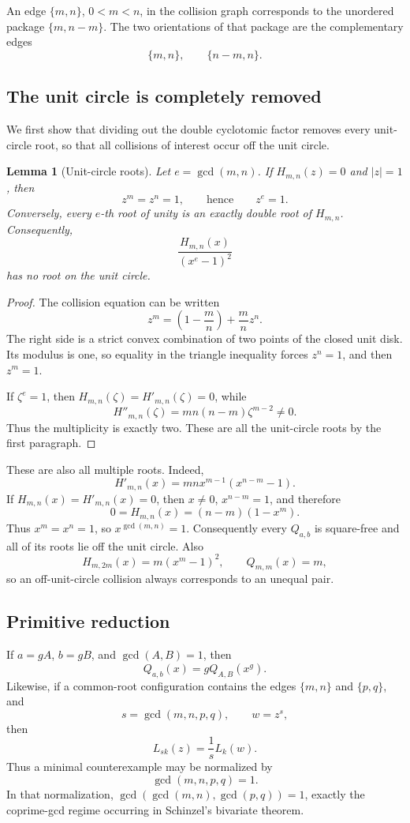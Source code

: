 \documentclass[11pt]{article}
\numberwithin{equation}{section}
\newtheorem{lemma}[theorem]{Lemma}
\theoremstyle{definition}
\begin{document}
An edge \(\{m,n\}\), \(0<m<n\), in the collision graph corresponds to the
unordered package \(\{m,n-m\}\).  The two orientations of that package are the
complementary edges
\[
 \{m,n\},\qquad \{n-m,n\}.
 \label{eq:2-4}
\]

\subsection{The unit circle is completely removed}

We first show that dividing out the double cyclotomic factor removes every
unit-circle root, so that all collisions of interest occur off the unit
circle.

\begin{lemma}[Unit-circle roots]\label{lem:unitcircle}
Let \(e=\gcd(m,n)\).  If \(H_{m,n}(z)=0\) and \(|z|=1\), then
\[
 z^m=z^n=1,
 \qquad\text{hence}\qquad z^e=1.
\]
Conversely, every \(e\)-th root of unity is an exactly double root of
\(H_{m,n}\).  Consequently,
\[
 \frac{H_{m,n}(x)}{(x^e-1)^2}
\]
has no root on the unit circle.
\end{lemma}

\begin{proof}
The collision equation can be written
\[
 z^m=\left(1-\frac mn\right)+\frac mn z^n.
\]
The right side is a strict convex combination of two points of the closed unit
disk.  Its modulus is one, so equality in the triangle inequality forces
\(z^n=1\), and then \(z^m=1\).

If \(\zeta^e=1\), then \(H_{m,n}(\zeta)=H'_{m,n}(\zeta)=0\), while
\[
 H''_{m,n}(\zeta)
 =mn(n-m)\zeta^{m-2}\neq0.
\]
Thus the multiplicity is exactly two.  These are all the unit-circle roots by
the first paragraph.
\end{proof}

These are also all multiple roots.  Indeed,
\[
 H'_{m,n}(x)=mnx^{m-1}(x^{n-m}-1).
\]
If \(H_{m,n}(x)=H'_{m,n}(x)=0\), then \(x\neq0\),
\(x^{n-m}=1\), and therefore
\[
 0=H_{m,n}(x)=(n-m)(1-x^m).
\]
Thus \(x^m=x^n=1\), so \(x^{\gcd(m,n)}=1\).  Consequently every
\(Q_{a,b}\) is square-free and all of its roots lie off the unit circle.
Also
\[
 H_{m,2m}(x)=m(x^m-1)^2,\qquad Q_{m,m}(x)=m,
\]
so an off-unit-circle collision always corresponds to an unequal pair.

\subsection{Primitive reduction}

If \(a=gA\), \(b=gB\), and \(\gcd(A,B)=1\), then
\begin{equation}
 Q_{a,b}(x)=gQ_{A,B}(x^g).
 \label{eq:2-5}
\end{equation}
Likewise, if a common-root configuration contains the edges \(\{m,n\}\) and
\(\{p,q\}\), and
\[
 s=\gcd(m,n,p,q),\qquad w=z^s,
\]
then
\begin{equation}
 L_{sk}(z)=\frac1sL_k(w).
 \label{eq:2-6}
\end{equation}
Thus a minimal counterexample may be normalized by
\[
 \gcd(m,n,p,q)=1.
 \label{eq:2-7}
\]
In that normalization,
\(\gcd(\gcd(m,n),\gcd(p,q))=1\), exactly the coprime-gcd regime occurring in
Schinzel's bivariate theorem.
\end{document}
